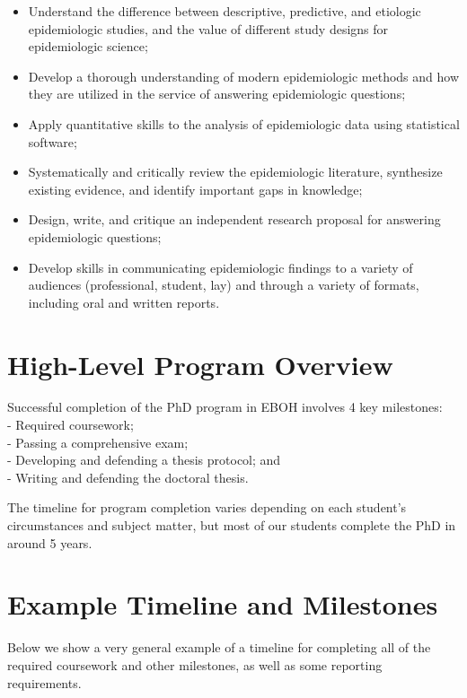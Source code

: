 \documentclass[
  openany]{book}
\providecommand{\tightlist}{%
  \setlength{\itemsep}{0pt}\setlength{\parskip}{0pt}}
\begin{document}
\begin{itemize}
\tightlist
\item
  Understand the difference between descriptive, predictive, and etiologic epidemiologic studies, and the value of different study designs for epidemiologic science;
\item
  Develop a thorough understanding of modern epidemiologic methods and how they are utilized in the service of answering epidemiologic questions;
\item
  Apply quantitative skills to the analysis of epidemiologic data using statistical software;
\item
  Systematically and critically review the epidemiologic literature, synthesize existing evidence, and identify important gaps in knowledge;
\item
  Design, write, and critique an independent research proposal for answering epidemiologic questions;
\item
  Develop skills in communicating epidemiologic findings to a variety of audiences (professional, student, lay) and through a variety of formats, including oral and written reports.
\end{itemize}

\hypertarget{high-level-program-overview}{%
\section{High-Level Program Overview}\label{high-level-program-overview}}

Successful completion of the PhD program in EBOH involves 4 key milestones:\\
- Required coursework;\\
- Passing a comprehensive exam;\\
- Developing and defending a thesis protocol; and\\
- Writing and defending the doctoral thesis.

The timeline for program completion varies depending on each student's circumstances and subject matter, but most of our students complete the PhD in around 5 years.

\hypertarget{example-timeline-and-milestones}{%
\section{Example Timeline and Milestones}\label{example-timeline-and-milestones}}

Below we show a very general example of a timeline for completing all of the required coursework and other milestones, as well as some reporting requirements.
\end{document}
